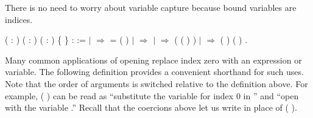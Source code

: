 \documentclass[12pt]{report}
\begin{document}
    There is no need to worry about variable capture because bound
    variables are indices.

\begin{coqdoccode}
\coqdocemptyline
\coqdocnoindent
{}  ( : ) ( : ) ( : ) \{ \} :  :=\coqdoceol
\coqdocindent{1.00em}
  \coqdoceol
\coqdocindent{1.00em}
\ensuremath{|}      \ensuremath{\Rightarrow}   =     ( )\coqdoceol
\coqdocindent{1.00em}
\ensuremath{|}      \ensuremath{\Rightarrow}  \coqdoceol
\coqdocindent{1.00em}
\ensuremath{|}      \ensuremath{\Rightarrow}  ( ( )  )\coqdoceol
\coqdocindent{1.00em}
\ensuremath{|}    \ensuremath{\Rightarrow}  (   ) (   )\coqdoceol
\coqdocindent{1.00em}
.\coqdoceol
\coqdocemptyline
\end{coqdoccode}
Many common applications of opening replace index zero with an
    expression or variable.  The following definition provides a
    convenient shorthand for such uses.  Note that the order of
    arguments is switched relative to the definition above.  For
    example, (  ) can be read as ``substitute the variable 
    for index 0 in '' and ``open  with the variable .''
    Recall that the coercions above let us write  in place of
    ( ).
\end{document}
